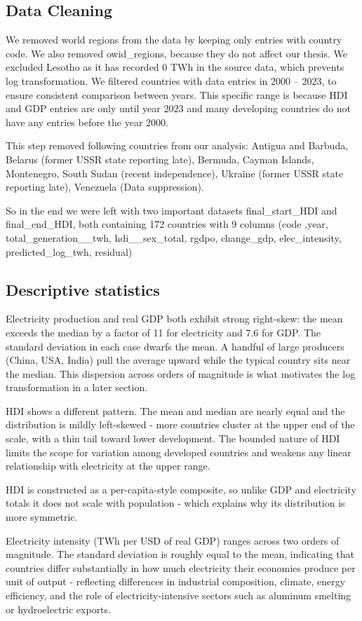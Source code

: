 \documentclass{article}
\begin{document}
	\subsection*{Data Cleaning}
		\par{}
		We removed world regions from the data by keeping only entries with country code.
We also removed owid\_regions, because they do not affect our thesis. 
We excluded Lesotho as it has recorded 0 TWh in the source data, which prevents log transformation.
We filtered countries with data entries in 2000 – 2023, to ensure consistent comparison between years. This specific range is because HDI and GDP entries are only until year 2023 and many developing countries do not have any entries before the year 2000.
		\par{} 
		This step removed following countries from our analysis:
Antigua and Barbuda, Belarus (former USSR state reporting late), Bermuda, Cayman Islands, Montenegro, South Sudan (recent independence), Ukraine (former USSR state reporting late), Venezuela (Data suppression).
		\par{}
		So in the end we were left with two important datasets final\_start\_HDI and final\_end\_HDI, both containing 172 countries with 9 columns (code ,year, total\_generation\_\_twh, hdi\_\_sex\_total, rgdpo, change\_gdp, elec\_intensity, predicted\_log\_twh, residual)
		\subsection*{Descriptive statistics}
		\par{}
		Electricity production and real GDP both exhibit strong right-skew: the mean exceeds the median by a factor of 11 for electricity and 7.6 for GDP. The standard deviation in each case dwarfs the mean. A handful of large producers (China, USA, India) pull the average upward while the typical country sits near the median. This dispersion across orders of magnitude is what motivates the log transformation in a later section.
		\par{}
		HDI shows a different pattern. The mean and median are nearly equal and the distribution is mildly left-skewed - more countries cluster at the upper end of the scale, with a thin tail toward lower development. The bounded nature of HDI limits the scope for variation among developed countries and weakens any linear relationship with electricity at the upper range.
		\par{}
		HDI is constructed as a per-capita-style composite, so unlike GDP and electricity totals it does not scale with population - which explains why its distribution is more symmetric.
		\par{}
		Electricity intensity (TWh per USD of real GDP) ranges across two orders of magnitude.  The standard deviation is roughly equal to the mean, indicating that countries differ substantially in how much electricity their economies produce per unit of output - reflecting differences in industrial composition, climate, energy efficiency, and the role of electricity-intensive sectors such as aluminum smelting or hydroelectric exports.
	\newpage
\end{document}
